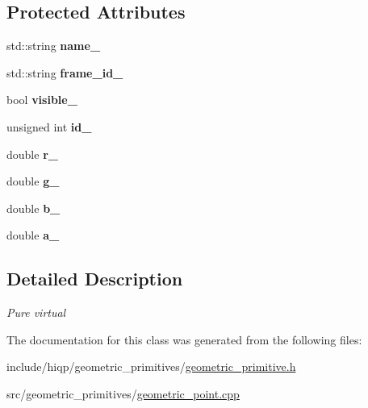 \subsection*{Protected Attributes}
\begin{DoxyCompactItemize}
\item 
\hypertarget{classhiqp_1_1GeometricPrimitive_a813733d420372d7a0cd215b3fbf382b0}{std\-::string {\bfseries name\-\_\-}}\label{classhiqp_1_1GeometricPrimitive_a813733d420372d7a0cd215b3fbf382b0}

\item 
\hypertarget{classhiqp_1_1GeometricPrimitive_adb3073ba5fa789cea8504de05e36e906}{std\-::string {\bfseries frame\-\_\-id\-\_\-}}\label{classhiqp_1_1GeometricPrimitive_adb3073ba5fa789cea8504de05e36e906}

\item 
\hypertarget{classhiqp_1_1GeometricPrimitive_a37748e9f1d35ab24628abbc83fbd5e8d}{bool {\bfseries visible\-\_\-}}\label{classhiqp_1_1GeometricPrimitive_a37748e9f1d35ab24628abbc83fbd5e8d}

\item 
\hypertarget{classhiqp_1_1GeometricPrimitive_a717d18ccc6c16cce67e8007193a813a6}{unsigned int {\bfseries id\-\_\-}}\label{classhiqp_1_1GeometricPrimitive_a717d18ccc6c16cce67e8007193a813a6}

\item 
\hypertarget{classhiqp_1_1GeometricPrimitive_a514e8dd9f42d004e9cd396a5097b9ca0}{double {\bfseries r\-\_\-}}\label{classhiqp_1_1GeometricPrimitive_a514e8dd9f42d004e9cd396a5097b9ca0}

\item 
\hypertarget{classhiqp_1_1GeometricPrimitive_acbe3664455392c9cdf027b8b1ad029de}{double {\bfseries g\-\_\-}}\label{classhiqp_1_1GeometricPrimitive_acbe3664455392c9cdf027b8b1ad029de}

\item 
\hypertarget{classhiqp_1_1GeometricPrimitive_ac408ceb1a8605c025c732a04adcd3367}{double {\bfseries b\-\_\-}}\label{classhiqp_1_1GeometricPrimitive_ac408ceb1a8605c025c732a04adcd3367}

\item 
\hypertarget{classhiqp_1_1GeometricPrimitive_a64483ffa46bf80de9d6e9fb58ee4f792}{double {\bfseries a\-\_\-}}\label{classhiqp_1_1GeometricPrimitive_a64483ffa46bf80de9d6e9fb58ee4f792}

\end{DoxyCompactItemize}


\subsection{Detailed Description}
{\itshape Pure virtual} 

The documentation for this class was generated from the following files\-:\begin{DoxyCompactItemize}
\item 
include/hiqp/geometric\-\_\-primitives/\hyperlink{geometric__primitive_8h}{geometric\-\_\-primitive.\-h}\item 
src/geometric\-\_\-primitives/\hyperlink{geometric__point_8cpp}{geometric\-\_\-point.\-cpp}\end{DoxyCompactItemize}
